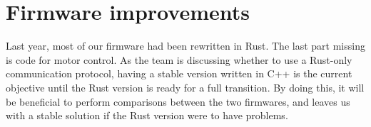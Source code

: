 \section{Firmware improvements}
Last year, most of our firmware had been rewritten in Rust.
The last part missing is code for motor control.
As the team is discussing whether to use a Rust-only communication protocol,
having a stable version written in C++ is the current objective until the Rust version
is ready for a full transition. By doing this, it will be beneficial
to perform comparisons between the two firmwares, and leaves us with a stable
solution if the Rust version were to have problems.



